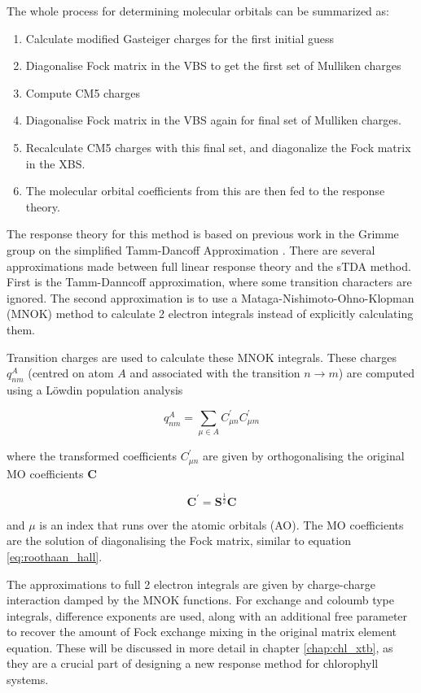The whole process for determining molecular orbitals can be summarized as:
\begin{enumerate}
	\item Calculate modified Gasteiger charges for the first initial guess
	\item Diagonalise Fock matrix in the VBS to get the first set of Mulliken charges
	\item Compute CM5 charges
	\item Diagonalise Fock matrix in the VBS again for final set of Mulliken charges.
	\item Recalculate CM5 charges with this final set, and diagonalize the Fock matrix in the XBS. 
	\item The molecular orbital coefficients from this are then fed to the response theory.
\end{enumerate}

The response theory for this method is based on previous work in the Grimme group
on the simplified Tamm-Dancoff Approximation \cite{Grimme2013}. There are several
approximations made between full linear response theory and the sTDA method. First
is the Tamm-Danncoff approximation, where some transition characters are ignored. 
The second approximation is to use a Mataga-Nishimoto-Ohno-Klopman (MNOK) method 
to calculate 2 electron integrals instead of explicitly calculating them.

Transition charges are used to calculate these MNOK integrals. These charges $q^A_{nm}$
(centred on atom $A$ and associated with the transition $ n \rightarrow m$) are
computed using a Löwdin population analysis

\begin{equation}
q_{nm}^A = \sum_{\mu \in A} C^\prime_{\mu n} C^\prime_{\mu m}
\end{equation}

where the transformed coefficients $C^\prime_{\mu n}$ are given by orthogonalising
the original MO coefficients $\textbf{C}$

\begin{equation}
\textbf{C}^\prime = \textbf{S}^{\frac{1}{2}} \textbf{C}
\end{equation}

and $\mu$ is an index that runs over the atomic orbitals (AO). The MO coefficients
are the solution of diagonalising the Fock matrix, similar to equation \ref{eq:roothaan_hall}.

The approximations to full 2 electron integrals are given by charge-charge interaction
damped by the MNOK\cite{Nishimoto1957}\cite{Ohno1964}\cite{Klopman1964} functions.
For exchange and coloumb type integrals, difference exponents are used, along with
an additional free parameter to recover the amount of Fock exchange mixing in
the original matrix element equation. These will be discussed in more detail in
chapter \ref{chap:chl_xtb}, as they are a crucial part of designing a new response 
method for chlorophyll systems.

